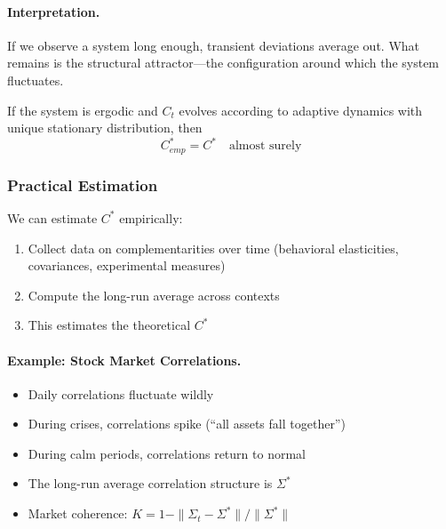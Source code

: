 \paragraph{Interpretation.}
If we observe a system long enough, transient deviations average out.
What remains is the structural attractor---the configuration around
which the system fluctuates.

\begin{proposition}
\label{prop:D-ergodic}
If the system is ergodic and $C_t$ evolves according to adaptive dynamics
with unique stationary distribution, then
\begin{equation}
C^*_{emp} = C^* \quad \text{almost surely}
\end{equation}
\end{proposition}

\subsubsection{Practical Estimation}

We can estimate $C^*$ empirically:
\begin{enumerate}
    \item Collect data on complementarities over time (behavioral elasticities,
          covariances, experimental measures)
    \item Compute the long-run average across contexts
    \item This estimates the theoretical $C^*$
\end{enumerate}

\paragraph{Example: Stock Market Correlations.}
\begin{itemize}[nosep]
    \item Daily correlations fluctuate wildly
    \item During crises, correlations spike (``all assets fall together'')
    \item During calm periods, correlations return to normal
    \item The long-run average correlation structure is $\Sigma^*$
    \item Market coherence: $K = 1 - \|\Sigma_t - \Sigma^*\|/\|\Sigma^*\|$
\end{itemize}



